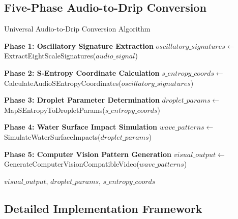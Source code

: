 \documentclass[12pt,a4paper]{article}
\begin{document}
\subsection{Five-Phase Audio-to-Drip Conversion}

\begin{algorithm}
\caption{Universal Audio-to-Drip Conversion Algorithm}
\begin{algorithmic}[1]
    \State \textbf{Phase 1: Oscillatory Signature Extraction}
    \State $oscillatory\_signatures \gets$ ExtractEightScaleSignatures($audio\_signal$)
    
    \State \textbf{Phase 2: S-Entropy Coordinate Calculation}
    \State $s\_entropy\_coords \gets$ CalculateAudioSEntropyCoordinates($oscillatory\_signatures$)
    
    \State \textbf{Phase 3: Droplet Parameter Determination}
    \State $droplet\_params \gets$ MapSEntropyToDropletParams($s\_entropy\_coords$)
    
    \State \textbf{Phase 4: Water Surface Impact Simulation}
    \State $wave\_patterns \gets$ SimulateWaterSurfaceImpacts($droplet\_params$)
    
    \State \textbf{Phase 5: Computer Vision Pattern Generation}
    \State $visual\_output \gets$ GenerateComputerVisionCompatibleVideo($wave\_patterns$)
    
    \State \Return $visual\_output$, $droplet\_params$, $s\_entropy\_coords$
\EndProcedure
\end{algorithmic}
\end{algorithm}

\subsection{Detailed Implementation Framework}
\end{document}
